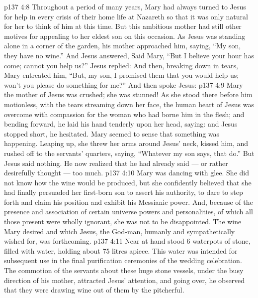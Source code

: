 \vs p137 4:8 Throughout a period of many years, Mary had always turned to Jesus for help in every crisis of their home life at Nazareth so that it was only natural for her to think of him at this time. But this ambitious mother had still other motives for appealing to her eldest son on this occasion. As Jesus was standing alone in a corner of the garden, his mother approached him, saying, “My son, they have no wine.” And Jesus answered,  Said Mary, “But I believe your hour has come; cannot you help us?” Jesus replied:  And then, breaking down in tears, Mary entreated him, “But, my son, I promised them that you would help us; won’t you please do something for me?” And then spoke Jesus: 
\vs p137 4:9 Mary the mother of Jesus was crushed; she was stunned! As she stood there before him motionless, with the tears streaming down her face, the human heart of Jesus was overcome with compassion for the woman who had borne him in the flesh; and bending forward, he laid his hand tenderly upon her head, saying:  and Jesus stopped short, he hesitated. Mary seemed to sense that something was happening. Leaping up, she threw her arms around Jesus’ neck, kissed him, and rushed off to the servants’ quarters, saying, “Whatever my son says, that do.” But Jesus said nothing. He now realized that he had already said --- or rather desirefully thought --- too much.
\vs p137 4:10 Mary was dancing with glee. She did not know how the wine would be produced, but she confidently believed that she had finally persuaded her first\hyp{}born son to assert his authority, to dare to step forth and claim his position and exhibit his Messianic power. And, because of the presence and association of certain universe powers and personalities, of which all those present were wholly ignorant, she was not to be disappointed. The wine Mary desired and which Jesus, the God\hyp{}man, humanly and sympathetically wished for, was forthcoming.
\vs p137 4:11 Near at hand stood 6 waterpots of stone, filled with water, holding about 75 litres apiece. This water was intended for subsequent use in the final purification ceremonies of the wedding celebration. The commotion of the servants about these huge stone vessels, under the busy direction of his mother, attracted Jesus’ attention, and going over, he observed that they were drawing wine out of them by the pitcherful.
